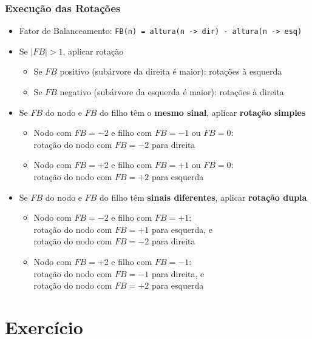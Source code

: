 \documentclass[aspectratio=169]{beamer}
\begin{document}
\begin{frame}\frametitle{Execução das Rotações}
\begin{itemize}
	\small
	\item	Fator de Balanceamento: \texttt{FB(n) = altura(n -> dir) - altura(n -> esq)}
	\item Se $|FB| > 1$, aplicar rotação
	\begin{itemize}
		\footnotesize
		\item Se $FB$ positivo (subárvore da direita é maior): rotações à esquerda
		\item Se $FB$ negativo (subárvore da esquerda é maior): rotações à direita
	\end{itemize}
	\item Se $FB$ do nodo e $FB$ do filho têm o \textbf{mesmo sinal}, aplicar \textbf{rotação simples}
	\begin{itemize}
		\footnotesize
		\item	Nodo com $FB = -2$ e filho com $FB = -1$ ou $FB = 0$:\\
			rotação do nodo com $FB = -2$ para direita
		\item	Nodo com $FB = +2$ e filho com $FB = +1$ ou $FB = 0$:\\
			rotação do nodo com $FB = +2$ para esquerda
	\end{itemize}
	\item Se $FB$ do nodo e $FB$ do filho têm \textbf{sinais diferentes}, aplicar \textbf{rotação dupla}
	\begin{itemize}
		\footnotesize
		\item	Nodo com $FB = -2$ e filho com $FB = +1$:\\
			rotação do nodo com $FB = +1$ para esquerda, e\\
			rotação do nodo com $FB = -2$ para direita
		\item	Nodo com $FB = +2$ e filho com $FB = -1$:\\
			rotação do nodo com $FB = -1$ para direita, e\\
			rotação do nodo com $FB = +2$ para esquerda
	\end{itemize}
\end{itemize}
\end{frame}

\section{Exercício}
\end{document}

